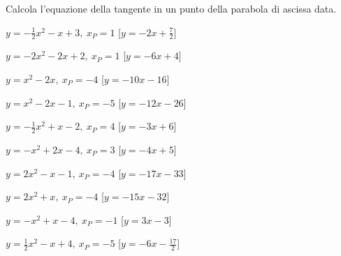\begin{esercizio}\label{ese:}
 Calcola l'equazione della tangente in un punto della parabola di ascissa data.
 \begin{enumeratea}
  \item  \(y=-\frac{1}{2} x^2 - x +3,~x_P=1\)
   \hfill [\(y = -2 x +\frac{7}{2}\)]
  \item  \(y=-2 x^2 -2 x +2,~x_P=1\)
   \hfill [\(y = -6 x +4\)]
  \item  \(y=x^2 -2 x ,~x_P=-4\)
   \hfill [\(y = -10 x -16\)]
  \item  \(y=x^2 -2 x -1,~x_P=-5\)
   \hfill [\(y = -12 x -26\)]
  \item  \(y=-\frac{1}{2} x^2 + x -2,~x_P=4\)
   \hfill [\(y = -3 x +6\)]
  \item  \(y=- x^2 +2 x -4,~x_P=3\)
   \hfill [\(y = -4 x +5\)]
  \item  \(y=2 x^2 - x -1,~x_P=-4\)
   \hfill [\(y = -17 x -33\)]
  \item  \(y=2 x^2 + x ,~x_P=-4\)
   \hfill [\(y = -15 x -32\)]
  \item  \(y=- x^2 + x -4,~x_P=-1\)
   \hfill [\(y = 3 x -3\)]
  \item  \(y=\frac{1}{2} x^2 - x +4,~x_P=-5\)
   \hfill [\(y = -6 x -\frac{17}{2}\)]
 \end{enumeratea}
\end{esercizio}

